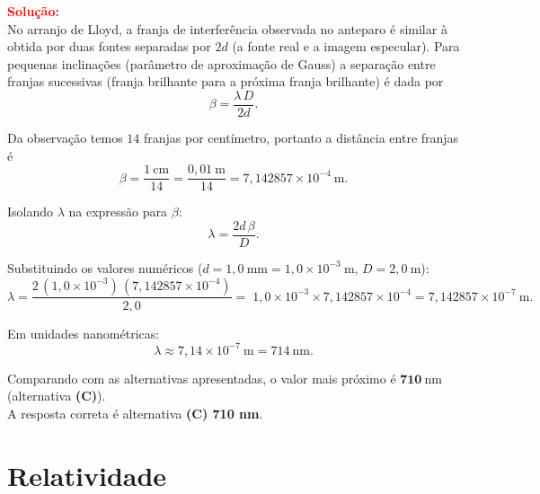 \documentclass[a4paper,12pt]{article}
\begin{document}
\begin{flushleft}
\vspace{0.5cm}

\textcolor{red}{\textbf{Solução:}}\\

No arranjo de Lloyd, a franja de interferência observada no anteparo é similar à obtida por duas fontes separadas por \(2d\) (a fonte real e a imagem especular). Para pequenas inclinações (parâmetro de aproximação de Gauss) a separação entre franjas sucessivas (franja brilhante para a próxima franja brilhante) é dada por
\[
\beta=\frac{\lambda\,D}{2d}.
\]

Da observação temos \(14\) franjas por centímetro, portanto a distância entre franjas é
\[
\beta=\frac{1\ \mathrm{cm}}{14}=\frac{0{,}01\ \mathrm{m}}{14}=7{,}142857\times 10^{-4}\ \mathrm{m}.
\]

Isolando \(\lambda\) na expressão para \(\beta\):
\[
\lambda=\frac{2d\,\beta}{D}.
\]

Substituindo os valores numéricos (\(d=1{,}0\ \mathrm{mm}=1{,}0\times10^{-3}\ \mathrm{m}\), \(D=2{,}0\ \mathrm{m}\)):
\[
\lambda=\frac{2\,(1{,}0\times10^{-3})\,(7{,}142857\times10^{-4})}{2{,}0}
=\;1{,}0\times10^{-3}\times 7{,}142857\times10^{-4}
=7{,}142857\times10^{-7}\ \mathrm{m}.
\]

Em unidades nanométricas:
\[
\lambda\approx 7{,}14\times10^{-7}\ \mathrm{m}=714\ \mathrm{nm}.
\]

Comparando com as alternativas apresentadas, o valor mais próximo é \(\mathbf{710\ \mathrm{nm}}\) (alternativa \textbf{(C)}).\\

A resposta correta é alternativa \colorbox{green!50}{\textbf{(C) 710 nm}}.
\end{flushleft}

\section{Relatividade}
\end{document}
